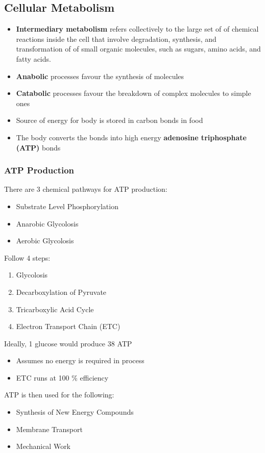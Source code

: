 \documentclass[11pt]{article}
\begin{document}
\subsection{Cellular Metabolism}
\begin{itemize}
\item \textbf{Intermediary metabolism }refers collectively to the large set of of chemical reactions inside the cell that involve degradation, synthesis, and transformation of of small organic molecules, such as sugars, amino acids, and fatty acids. 
\item \textbf{Anabolic} processes favour the synthesis of molecules 
\item \textbf{Catabolic} processes favour the breakdown of complex molecules to simple ones
\item Source of energy for body is stored in carbon bonds in food
\item The body converts the bonds into high energy \textbf{adenosine triphosphate (ATP) }bonds
\end{itemize}
\subsubsection{ATP Production}
There are 3 chemical pathways for ATP production:
\begin{itemize}
\item Substrate Level Phosphorylation
\item Anarobic Glycolosis
\item Aerobic Glycolosis
\end{itemize}
Follow 4 steps:
\begin{enumerate}
\item Glycolosis
\item Decarboxylation of Pyruvate
\item Tricarboxylic Acid Cycle
\item Electron Transport Chain (ETC)
\end{enumerate}
Ideally, 1 glucose would produce 38 ATP
\begin{itemize}
\item Assumes no energy is required in process
\item ETC runs at 100 \% efficiency
\end{itemize}
ATP is then used for the following:
\begin{itemize}
\item Synthesis of New Energy Compounds
\item Membrane Transport
\item Mechanical Work
\end{itemize}
\end{document}
